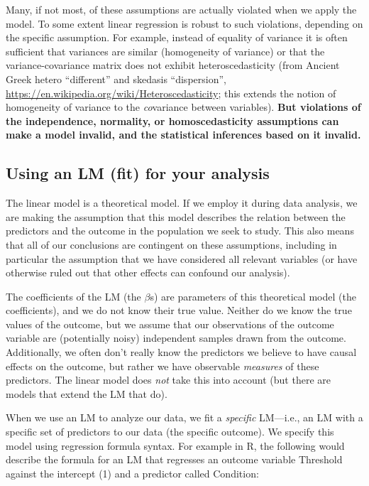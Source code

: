 \documentclass[
]{article}
\begin{document}
Many, if not most, of these assumptions are actually violated when we
apply the model. To some extent linear regression is robust to such
violations, depending on the specific assumption. For example, instead
of equality of variance it is often sufficient that variances are
similar (homogeneity of variance) or that the variance-covariance matrix
does not exhibit heteroscedasticity (from Ancient Greek hetero
``different'' and skedasis ``dispersion'',
\url{https://en.wikipedia.org/wiki/Heteroscedasticity}; this extends the
notion of homogeneity of variance to the \emph{co}variance between
variables). \textbf{But violations of the independence, normality, or
homoscedasticity assumptions can make a model invalid, and the
statistical inferences based on it invalid.}

\hypertarget{using-an-lm-fit-for-your-analysis}{%
\subsection{Using an LM (fit) for your
analysis}\label{using-an-lm-fit-for-your-analysis}}

The linear model is a theoretical model. If we employ it during data
analysis, we are making the assumption that this model describes the
relation between the predictors and the outcome in the population we
seek to study. This also means that all of our conclusions are
contingent on these assumptions, including in particular the assumption
that we have considered all relevant variables (or have otherwise ruled
out that other effects can confound our analysis).

The coefficients of the LM (the \(\beta\)s) are parameters of this
theoretical model (the coefficients), and we do not know their true
value. Neither do we know the true values of the outcome, but we assume
that our observations of the outcome variable are (potentially noisy)
independent samples drawn from the outcome. Additionally, we often don't
really know the predictors we believe to have causal effects on the
outcome, but rather we have observable \emph{measures} of these
predictors. The linear model does \emph{not} take this into account (but
there are models that extend the LM that do).

When we use an LM to analyze our data, we fit a \emph{specific}
LM---i.e., an LM with a specific set of predictors to our data (the
specific outcome). We specify this model using regression formula
syntax. For example in R, the following would describe the formula for
an LM that regresses an outcome variable Threshold against the intercept
(1) and a predictor called Condition:
\end{document}
